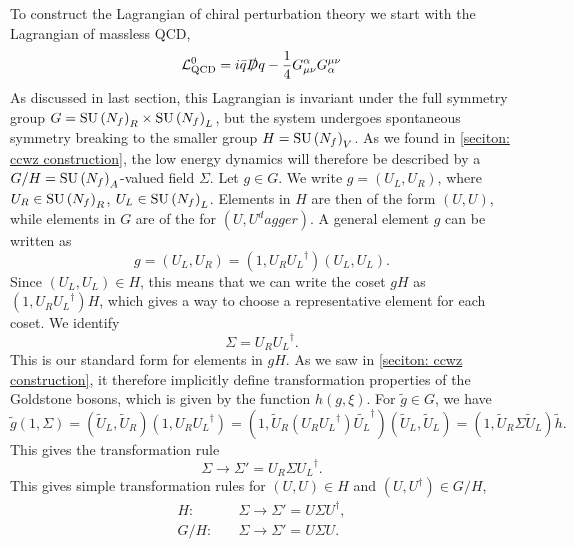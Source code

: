 To construct the Lagrangian of chiral perturbation theory we start with the Lagrangian of massless QCD, 
%
\begin{equation}
    \mathcal{L}^0_\text{QCD} = i \bar q \slashed D q - \frac{1}{4} G^\alpha_{\mu \nu} G_\alpha^{\mu \nu}
\end{equation}
%
As discussed in last section, this Lagrangian is invariant under the full symmetry group $G = \text{SU}\left(N_f\right)_R \times \text{SU}\left(N_f\right)_L$, but the system undergoes spontaneous symmetry breaking to the smaller group $H = \text{SU}\left(N_f\right)_V$.
As we found in \autoref{seciton: ccwz construction}, the low energy dynamics will therefore be described by a $G/H = \text{SU}\left(N_f\right)_A$-valued field $\Sigma$.
Let $g \in G$.
We write $g = (U_L, U_R)$, where $U_R \in \text{SU}\left(N_f\right)_R$, $U_L \in \text{SU}\left(N_f\right)_L$.
Elements in $H$ are then of the form $(U, U)$, while elements in $G$ are of the for $(U, U^dagger)$.
A general element $g$ can be written as
%
\begin{equation}
    g = (U_L, U_R) = (1, U_R {U_L}^\dagger) (U_L, U_L).
\end{equation}
%
Since $(U_L, U_L) \in H$, this means that we can write the coset $g H$ as $(1, U_R {U_L}^\dagger)H$, which gives a way to choose a representative element for each coset.
We identify
%
\begin{equation}
    \Sigma = U_R {U_L}^\dagger. 
\end{equation}
%
This is our standard form for elements in $gH$.
As we saw in \autoref{seciton: ccwz construction}, it therefore implicitly define transformation properties of the Goldstone bosons, which is given by the function $h(g, \xi)$.
For $\tilde g \in G$, we have
%
\begin{equation}
    \tilde g (1, \Sigma)
    = (\tilde U_L, \tilde U_R) (1, U_R {U_L}^\dagger)
    = (1, \tilde U_R (U_R {U_L}^\dagger) \tilde {U_L}^\dagger) (\tilde U_L, \tilde U_L)
    = (1, \tilde U_R \Sigma \tilde U_L) \tilde h.
\end{equation}
%
This gives the transformation rule
\begin{equation}
    \Sigma \rightarrow \Sigma' = U_R \Sigma {U_L}^\dagger.
\end{equation}
%
This gives simple transformation rules for $(U, U) \in H$ and $(U, U^\dagger) \in G/H$,
\begin{align}
    \label{sigma transform under H}
    H:& \quad \Sigma \rightarrow \Sigma' = U \Sigma U^\dagger, \\
    \label{sigma transform under G/H}
    G/H:& \quad \Sigma \rightarrow \Sigma' = U \Sigma U.
\end{align}
